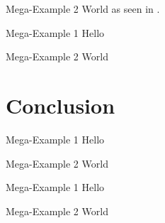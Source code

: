 \documentclass[aspectratio=169,usepdftitle=true]{beamer}
\begin{document}
\begin{frame}{Mega-Example 2}
    World as seen in \cite{pdf:ddc}.
\end{frame}


\begin{frame}{Mega-Example 1}
    Hello
\end{frame}

\begin{frame}{Mega-Example 2}
    World
\end{frame}


\section{Conclusion}

\begin{frame}{Mega-Example 1}
    Hello
\end{frame}

\begin{frame}{Mega-Example 2}
    World
\end{frame}


\begin{frame}{Mega-Example 1}
    Hello
\end{frame}

\begin{frame}{Mega-Example 2}
    World
\end{frame}

%
\end{document}
